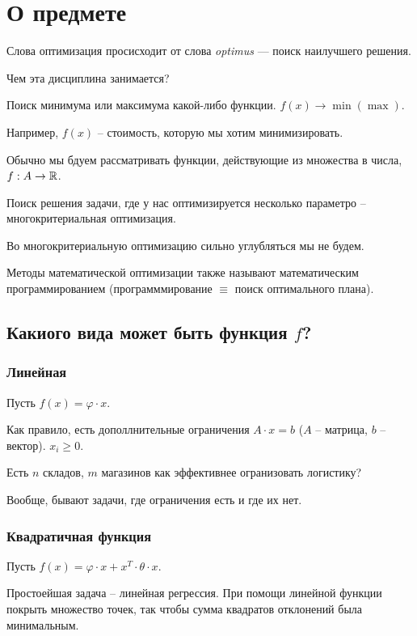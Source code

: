 \section{О предмете}

Слова оптимизация просисходит от слова \textit{optimus} --- поиск наилучшего решения.

Чем эта дисциплина занимается?

Поиск минимума или максимума какой-либо функции.
$f(x) \to \min (\max)$.

Например, $f(x)$ -- стоимость, которую мы хотим минимизировать.

Обычно мы бдуем рассматривать функции, действующие из множества в числа, $f: A \to \mathbb{R}$.

Поиск решения задачи, где у нас оптимизируется несколько параметро -- многокритериальная оптимизация.

Во многокритериальную оптимизацию сильно углубляться мы не будем.

Методы математической оптимизации также называют математическим программированием (программмирование $\equiv$ поиск оптимального плана).


\subsection{Какиого вида может быть функция $f$?}

\subsubsection{Линейная}
Пусть $f(x) = \varphi \cdot x$.

Как правило, есть дополлнительные ограничения $A \cdot x = b$ ($A$ -- матрица, $b$ -- вектор).
$x_i \geqslant 0$.

\begin{example}
    Есть $n$ складов, $m$ магазинов как эффективнее огранизовать логистику?
\end{example}

Вообще, бывают задачи, где ограничения есть и где их нет.

\subsubsection{Квадратичная функция}
Пусть $f(x) = \varphi \cdot x + x^T \cdot \theta \cdot x$.

Простоейшая задача -- линейная регрессия.
При помощи линейной функции покрыть множество точек, так чтобы сумма квадратов отклонений была минимальным.

